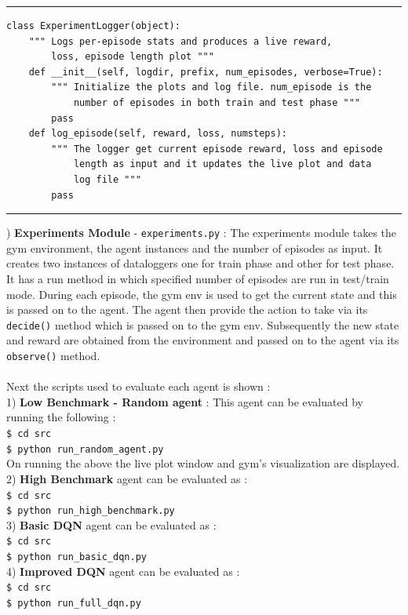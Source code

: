 \documentclass{article}
\begin{document}
\hrule
\begin{verbatim}
class ExperimentLogger(object):
    """ Logs per-episode stats and produces a live reward,
        loss, episode length plot """
    def __init__(self, logdir, prefix, num_episodes, verbose=True):
        """ Initialize the plots and log file. num_episode is the
            number of episodes in both train and test phase """
        pass
    def log_episode(self, reward, loss, numsteps):
        """ The logger get current episode reward, loss and episode 
            length as input and it updates the live plot and data 
            log file """
        pass
\end{verbatim}
\hrule
{}) \textbf{Experiments Module} - \texttt{experiments.py} : The experiments module takes the gym environment, the agent instances and the number of episodes as input. It creates two instances of dataloggers one for train phase and other for test phase. It has a run method in which specified number of episodes are run in test/train mode. During each episode, the gym env is used to get the current state and this is passed on to the agent. The agent then provide the action to take via its \texttt{decide()} method which is passed on to the gym env. Subsequently the new state and reward are obtained from the environment and passed on to the agent via its \texttt{observe()} method.\\\\
Next the scripts used to evaluate each agent is shown :\\
1) \textbf{Low Benchmark - Random agent} : This agent can be evaluated by running the following :
\texttt{\\\$ cd src}
\texttt{\\\$ python run\_random\_agent.py}\\
On running the above the live plot window and gym's visualization are displayed.\\
2) \textbf{High Benchmark} agent can be evaluated as :
\texttt{\\\$ cd src}
\texttt{\\\$ python run\_high\_benchmark.py}\\
3) \textbf{Basic DQN} agent can be evaluated as :
\texttt{\\\$ cd src}
\texttt{\\\$ python run\_basic\_dqn.py}\\
4) \textbf{Improved DQN} agent can be evaluated as :
\texttt{\\\$ cd src}
\texttt{\\\$ python run\_full\_dqn.py}
\end{document}
